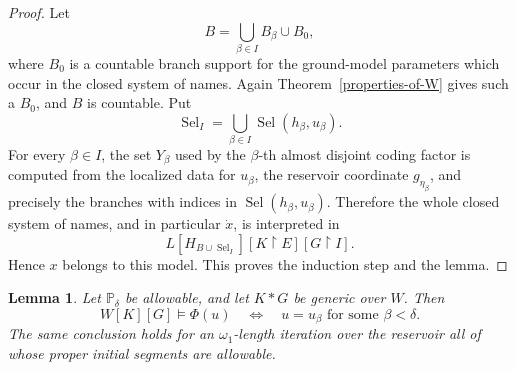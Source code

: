 \documentclass[a4paper,11pt]{article}
\newtheorem{lemma}[theorem]{Lemma}
\newcommand{\forceP}{\mathbb{P}}
\begin{document}
\begin{proof}
Let
\[
   B=\bigcup_{\beta\in I} B_\beta\cup B_0,
\]
where $B_0$ is a countable branch support for the ground-model parameters
which occur in the closed system of names.  Again
Theorem~\ref{properties-of-W} gives such a $B_0$, and $B$ is countable.  Put
\[
   \operatorname{Sel}_I=
   \bigcup_{\beta\in I}\operatorname{Sel}(h_\beta,u_\beta).
\]
For every $\beta\in I$, the set $Y_\beta$ used by the $\beta$-th almost
disjoint coding factor is computed from the localized data for $u_\beta$, the
reservoir coordinate $g_{\eta_\beta}$, and precisely the branches with indices
in $\operatorname{Sel}(h_\beta,u_\beta)$.  Therefore the whole closed system of
names, and in particular $\dot x$, is interpreted in
\[
   L[H_{B\cup\operatorname{Sel}_I}]
    [K\upharpoonright E]
    [G\upharpoonright I].
\]
Hence $x$ belongs to this model.  This proves the induction step and the
lemma.
\end{proof}

\begin{lemma}\label{no-unwanted-allowable-codes}
Let $\forceP_\delta$ be allowable, and let $K*G$ be generic over $W$.  Then
\[
   W[K][G]\models
   \Phi(u)
   \quad\Longleftrightarrow\quad
   u=u_\beta\text{ for some }\beta<\delta.
\]
The same conclusion holds for an $\omega_1$-length iteration over the reservoir
all of whose proper initial segments are allowable.
\end{lemma}
\end{document}
